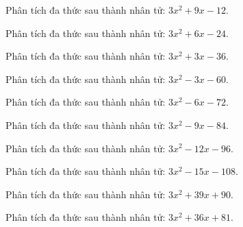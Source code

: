 \begin{bt}
	Phân tích đa thức sau thành nhân tử: $3 x^2 + 9 x - 12$.
\end{bt}
\begin{bt}
	Phân tích đa thức sau thành nhân tử: $3 x^2 + 6 x - 24$.
\end{bt}
\begin{bt}
	Phân tích đa thức sau thành nhân tử: $3 x^2 + 3 x - 36$.
\end{bt}
\begin{bt}
	Phân tích đa thức sau thành nhân tử: $3 x^2 - 3 x - 60$.
\end{bt}
\begin{bt}
	Phân tích đa thức sau thành nhân tử: $3 x^2 - 6 x - 72$.
\end{bt}
\begin{bt}
	Phân tích đa thức sau thành nhân tử: $3 x^2 - 9 x - 84$.
\end{bt}
\begin{bt}
	Phân tích đa thức sau thành nhân tử: $3 x^2 - 12 x - 96$.
\end{bt}
\begin{bt}
	Phân tích đa thức sau thành nhân tử: $3 x^2 - 15 x - 108$.
\end{bt}
\begin{bt}
	Phân tích đa thức sau thành nhân tử: $3 x^2 + 39 x + 90$.
\end{bt}
\begin{bt}
	Phân tích đa thức sau thành nhân tử: $3 x^2 + 36 x + 81$.
\end{bt}
